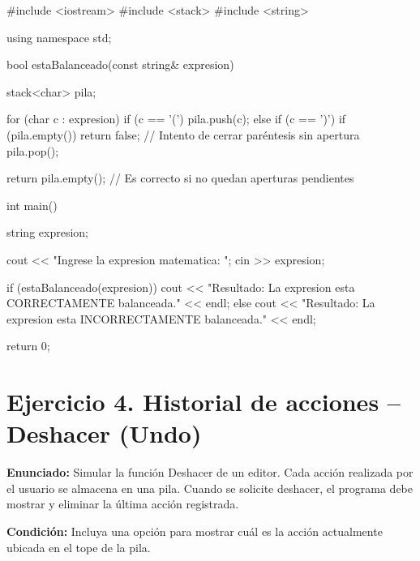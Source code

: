 \documentclass[11pt, a4paper]{article}
\begin{document}
\begin{codebox}[title={CÓDIGO FUENTE: Ejercicio 3}]
#include <iostream>
#include <stack>
#include <string>

using namespace std;

bool estaBalanceado(const string& expresion) {
    stack<char> pila;

    for (char c : expresion) {
        if (c == '(') {
            pila.push(c);
        } else if (c == ')') {
            if (pila.empty()) {
                return false; // Intento de cerrar paréntesis sin apertura
            }
            pila.pop();
        }
    }

    return pila.empty(); // Es correcto si no quedan aperturas pendientes
}

int main() {
    string expresion;

    cout << "Ingrese la expresion matematica: ";
    cin >> expresion;

    if (estaBalanceado(expresion)) {
        cout << "Resultado: La expresion esta CORRECTAMENTE balanceada." << endl;
    } else {
        cout << "Resultado: La expresion esta INCORRECTAMENTE balanceada." << endl;
    }

    return 0;
}
\end{codebox}


\newpage

\section*{Ejercicio 4. Historial de acciones -- Deshacer (Undo)}

\textbf{Enunciado:} Simular la función Deshacer de un editor. Cada acción realizada por el usuario se almacena en una pila. Cuando se solicite deshacer, el programa debe mostrar y eliminar la última acción registrada.

\textbf{Condición:} Incluya una opción para mostrar cuál es la acción actualmente ubicada en el tope de la pila.
\end{document}
